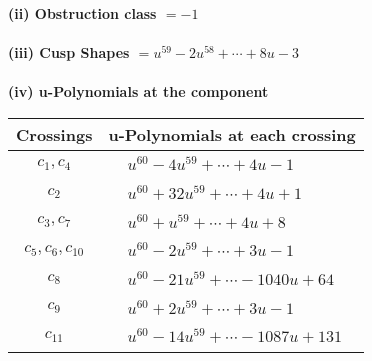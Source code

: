 \documentclass[1p]{elsarticle_modified}
\theoremstyle{definition}
\begin{document}
\flushleft \textbf{(ii) Obstruction class $= -1$}\\~\\
\flushleft \textbf{(iii) Cusp Shapes $= u^{59}-2 u^{58}+\cdots+8 u-3$}\\~\\
\newpage\renewcommand{\arraystretch}{1}
\flushleft \textbf{(iv) u-Polynomials at the component}\newline \\
\begin{tabular}{m{50pt}|m{274pt}}
Crossings & \hspace{64pt}u-Polynomials at each crossing \\
\hline $$\begin{aligned}c_{1},c_{4}\end{aligned}$$&$\begin{aligned}
&u^{60}-4 u^{59}+\cdots+4 u-1
\end{aligned}$\\
\hline $$\begin{aligned}c_{2}\end{aligned}$$&$\begin{aligned}
&u^{60}+32 u^{59}+\cdots+4 u+1
\end{aligned}$\\
\hline $$\begin{aligned}c_{3},c_{7}\end{aligned}$$&$\begin{aligned}
&u^{60}+u^{59}+\cdots+4 u+8
\end{aligned}$\\
\hline $$\begin{aligned}c_{5},c_{6},c_{10}\end{aligned}$$&$\begin{aligned}
&u^{60}-2 u^{59}+\cdots+3 u-1
\end{aligned}$\\
\hline $$\begin{aligned}c_{8}\end{aligned}$$&$\begin{aligned}
&u^{60}-21 u^{59}+\cdots-1040 u+64
\end{aligned}$\\
\hline $$\begin{aligned}c_{9}\end{aligned}$$&$\begin{aligned}
&u^{60}+2 u^{59}+\cdots+3 u-1
\end{aligned}$\\
\hline $$\begin{aligned}c_{11}\end{aligned}$$&$\begin{aligned}
&u^{60}-14 u^{59}+\cdots-1087 u+131
\end{aligned}$\\
\hline
\end{tabular}\\~\\
\end{document}
